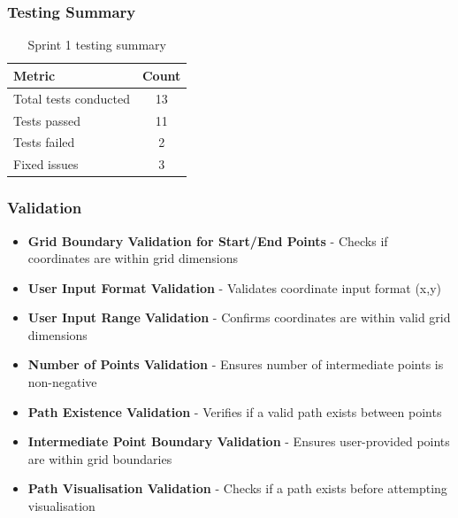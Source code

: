 \subsubsection{Testing Summary}
\begin{table}[htbp]
\centering
\begin{tabular}{|l|c|}
\hline
\textbf{Metric} & \textbf{Count} \\
\hline
Total tests conducted & 13 \\
\hline
Tests passed & 11 \\
\hline
Tests failed & 2 \\
\hline
Fixed issues & 3 \\
\hline
\end{tabular}
\caption{Sprint 1 testing summary}
\end{table}

\newpage

\subsubsection{Validation}
    \begin{itemize}
    \item \textbf{Grid Boundary Validation for Start/End Points} - Checks if coordinates are within grid dimensions
    \item \textbf{User Input Format Validation} - Validates coordinate input format (x,y)
    \item \textbf{User Input Range Validation} - Confirms coordinates are within valid grid dimensions
    \item \textbf{Number of Points Validation} - Ensures number of intermediate points is non-negative
    \item \textbf{Path Existence Validation} - Verifies if a valid path exists between points
    \item \textbf{Intermediate Point Boundary Validation} - Ensures user-provided points are within grid boundaries
    \item \textbf{Path Visualisation Validation} - Checks if a path exists before attempting visualisation
\end{itemize}


